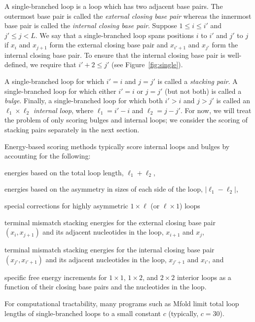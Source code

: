 \documentclass{article}
\begin{document}
  A single-branched loop is a loop which has two adjacent base pairs.
  The outermost base pair is called the \emph{external closing base pair}
  whereas the innermost base pair is called the 
  \emph{internal closing base pair}.  Suppose $1 \le i \le i'$ and $j' \le j < L$.  
  We say that a single-branched loop spans positions $i$ to $i'$ and $j'$ to $j$ if
  $x_i$ and $x_{j+1}$ form the external closing base pair and
  $x_{i'+1}$ and $x_{j'}$ form the internal closing base pair.  To ensure 
  that the internal closing base pair is well-defined, we require that $i'+2 \le j'$
  (see Figure~\ref{fig:single}).

  A single-branched loop for which $i'=i$ and $j=j'$ is called a \emph{stacking pair}.
  A single-branched loop for which either $i'=i$ or $j=j'$ (but not both) is called a \emph{bulge}.
  Finally, a single-branched loop for which both $i'>i$ and $j>j'$ is called an $\ell_1 \times \ell_2$ \emph{internal loop}, 
  where $\ell_1 = i'-i$ and $\ell_2 = j-j'$.
  For now, we will treat the problem of only scoring bulges and internal loops; we
  consider the scoring of stacking pairs separately in the next section.
  
  Energy-based scoring methods typically score internal loops and bulges by accounting for the
  following:
  \begin{itemize-compact}
  \item energies based on the total loop length, $\ell_1 + \ell_2$,
  \item energies based on the asymmetry in sizes of each side of the loop, $|\ell_1 - \ell_2|$,
  \item special corrections for highly asymmetric $1 \times \ell$ (or $\ell \times 1$) loops 
  \item terminal mismatch stacking energies for the external closing base
    pair $(x_i,x_{j+1})$ and its adjacent nucleotides in the loop,
    $x_{i+1}$ and $x_j$,
  \item terminal mismatch stacking energies for the internal closing base
    pair $(x_{j'},x_{i'+1})$ and its adjacent nucleotides in the loop,
    $x_{j'+1}$ and $x_{i'}$, and
  \item specific free energy increments for $1 \times 1$, $1 \times 2$, and $2 \times 2$ interior loops
    as a function of their closing base pairs and the nucleotides in the loop.
  \end{itemize-compact}
  For computational tractability, many programs such as Mfold limit total loop lengths of
  single-branched loops to a small constant $c$ (typically, $c=30$).
\end{document}
